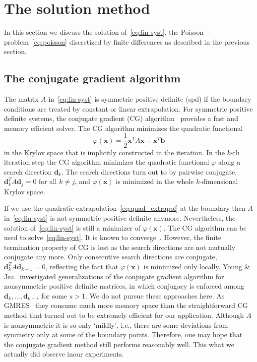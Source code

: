 \section{The solution method}
\label{sec:method}

In this section we discuss the solution of~\eqref{eq:lin-syst}, the
Poisson problem~\eqref{eq:poisson} discretized by finite differences as
described in the previous section.

\subsection{The conjugate gradient algorithm}

The matrix $A$ in~\eqref{eq:lin-syst} is symmetric positive definite
(spd) if the boundary conditions are treated by constant or linear
extrapolation.  For symmetric positive definite systems, the conjugate
gradient (CG) algorithm~\cite{hack:94,hest:52} provides a fast and
memory efficient solver.  The CG algorithm minimizes the quadratic
functional
\begin{equation} \label{eq:cg-funct}
  \varphi(\mathbf{x}) = \frac{1}{2}\mathbf{x}^T A \mathbf{x} - \mathbf{x}^T
  \mathbf{b}
\end{equation}
in the Krylov space that is implicitly constructed in the iteration.  In
the $k$-th iteration step the CG algorithm minimizes the quadratic
functional $\varphi$ along a search direction $\mathbf{d}_k$.  The search
directions turn out to by pairwise conjugate, $\mathbf{d}_k^T A
\mathbf{d}_j = 0$ for all $k\neq j$, and $\varphi(\mathbf{x})$ is
minimized in the whole $k$-dimensional Krylov space.

If we use the quadratic extrapolation~\eqref{eq:quad_extrapol} at the
boundary then $A$ in~\eqref{eq:lin-syst} is not symmetric positive
definite anymore.  Nevertheless, the solution of~\eqref{eq:lin-syst} is
still a minimizer of $\varphi(\mathbf{x})$.  The CG algorithm can be
used to solve~\eqref{eq:lin-syst}.  It is known to
converge~\cite{gree:97}.  However, the finite termination property of CG
is lost as the search directions are not mutually conjugate any more.
Only consecutive search directions are conjugate, $\mathbf{d}_k^T A
\mathbf{d}_{k-1} = 0$, reflecting the fact that $\varphi(\mathbf{x})$ is
minimized only locally.
Young \& Jea~\cite{yoje:80} investigated generalizations of the
conjugate gradient algorithm for nonsymmetric positive definite
matrices, in which conjugacy is enforced among $\mathbf{d}_k, \ldots,
\mathbf{d}_{k-s}$ for some $s>1$.  We do not pursue these approaches
here.  As GMRES~\cite{sasc:86} they consume much more memory space than
the straightforward CG method that turned out to be extremely efficient
for our application.  Although $A$ is nonsymmetric it is so only
`mildly', i.e., there are some deviations from symmetry only at some of
the boundary points.  Therefore, one may hope that the conjugate
gradient method still performs reasonably well.  This what we actually
did observe inour experiments.

